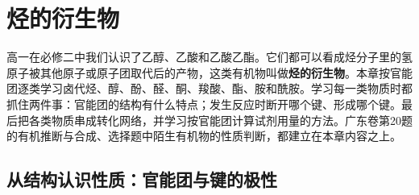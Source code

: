 \newcommand{\ctencut}[2]{\draw[c10cut] ($(#1)!0.5!(#2)!0.26cm!90:(#2)$)--($(#1)!0.5!(#2)!0.26cm!-90:(#2)$);}
\newcommand{\ctentube}[5]{%
  \fill[#5] (#1-0.22,#2+#4) -- (#1-0.22,#2+0.22) arc (180:360:0.22) -- (#1+0.22,#2+#4) -- cycle;
  \draw[c10glass] (#1-0.22,#2+#3) -- (#1-0.22,#2+0.22) arc (180:360:0.22) -- (#1+0.22,#2+#3);}
\newcommand{\ctenlamp}[2]{%
  \draw[c10glass,fill=black!5] (#1-0.4,#2) -- (#1+0.4,#2) -- (#1+0.28,#2+0.5) -- (#1-0.28,#2+0.5) -- cycle;
  \draw[c10glass] (#1-0.08,#2+0.5) rectangle (#1+0.08,#2+0.62);
  \fill[orange!70] (#1,#2+0.62) .. controls (#1-0.18,#2+0.8) and (#1-0.05,#2+1.0) .. (#1,#2+1.15)
    .. controls (#1+0.05,#2+1.0) and (#1+0.18,#2+0.8) .. (#1,#2+0.62);}

\chapter{烃的衍生物}

高一在必修二中我们认识了乙醇、乙酸和乙酸乙酯。它们都可以看成烃分子里的氢原子被其他原子或原子团取代后的产物，这类有机物叫做\textbf{烃的衍生物}。本章按官能团逐类学习卤代烃、醇、酚、醛、酮、羧酸、酯、胺和酰胺。学习每一类物质时都抓住两件事：官能团的结构有什么特点；发生反应时断开哪个键、形成哪个键。最后把各类物质串成转化网络，并学习按官能团计算试剂用量的方法。广东卷第20题的有机推断与合成、选择题中陌生有机物的性质判断，都建立在本章内容之上。

\section{从结构认识性质：官能团与键的极性}

